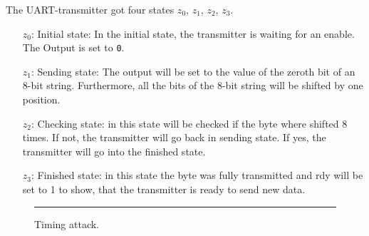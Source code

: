 The UART-transmitter got four states $z_0$, $z_1$, $z_2$, $z_3$.
\begin{itemize}


\item[$z_0$:] Initial state: In the initial state, the transmitter is waiting for an enable. The Output is set to \verb+0+.
\item[$z_1$:] Sending state: The output will be set to the value of the zeroth bit of an 8-bit string. Furthermore, all the bits of the 8-bit string will be shifted by one position.
\item[$z_2$:] Checking state: in this state will be checked if the byte where shifted 8 times. If not, the transmitter will go back in sending state. If yes, the transmitter will go into the finished state.
\item[$z_3$:] Finished state: in this state the byte was fully transmitted and rdy will be set to 1 to show, that the transmitter is ready to send new data.

\end{itemize}\newpage

\begin{figure}[h!]
    \begin{center}
        
        \caption{Timing attack.}
        \label{fig:as5-schematic}
        \vspace{1em}\hrule
    \end{center}
\end{figure}
